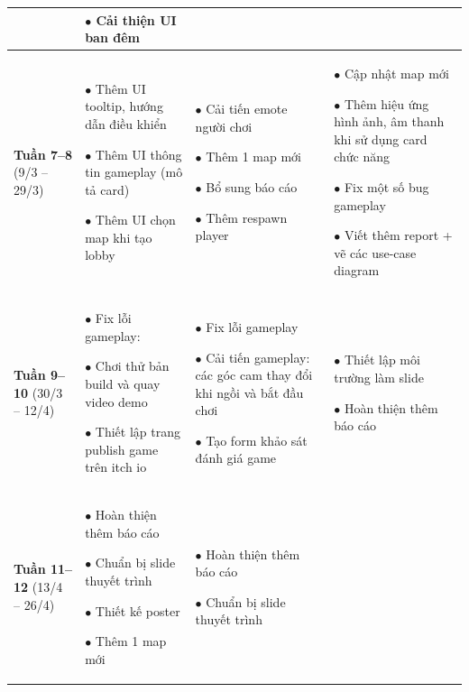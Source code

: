 \begin{longtable}{|p{2cm}|p{4cm}|p{4cm}|p{4cm}|}
&
    $\bullet$ Cải thiện UI ban đêm 
    
    
\\
\hline

\textbf{Tuần 7--8} \newline (9/3 -- 29/3)
&
    $\bullet$ Thêm UI tooltip, hướng dẫn điều khiển
    
    $\bullet$ Thêm UI thông tin gameplay (mô tả card)
    
    $\bullet$ Thêm UI chọn map khi tạo lobby

&
    $\bullet$ Cải tiến emote người chơi
    
    $\bullet$ Thêm 1 map mới
    
    $\bullet$ Bổ sung báo cáo

    $\bullet$ Thêm respawn player
    
&    
    $\bullet$ Cập nhật map mới
    
    $\bullet$ Thêm hiệu ứng hình ảnh, âm thanh khi sử dụng card chức năng
    
    $\bullet$ Fix một số bug gameplay

    $\bullet$ Viết thêm report + vẽ các use-case diagram
\\
\hline

\textbf{Tuần 9--10} \newline (30/3 -- 12/4)
&
    $\bullet$ Fix lỗi gameplay:
    
    $\bullet$ Chơi thử bản build và quay video demo
    
    $\bullet$ Thiết lập trang publish game trên itch io
    
&
    $\bullet$ Fix lỗi gameplay
    
    $\bullet$ Cải tiến gameplay: các góc cam thay đổi khi ngồi và bắt đầu chơi
    
    $\bullet$ Tạo form khảo sát đánh giá game
&
    $\bullet$ Thiết lập môi trường làm slide
    
    $\bullet$ Hoàn thiện thêm báo cáo
\\
\hline

\textbf{Tuần 11--12} \newline (13/4 -- 26/4)
&
    $\bullet$ Hoàn thiện thêm báo cáo
    
    $\bullet$ Chuẩn bị slide thuyết trình

    $\bullet$ Thiết kế poster

    $\bullet$ Thêm 1 map mới
&
    $\bullet$ Hoàn thiện thêm báo cáo
    
    $\bullet$ Chuẩn bị slide thuyết trình


\end{longtable}
